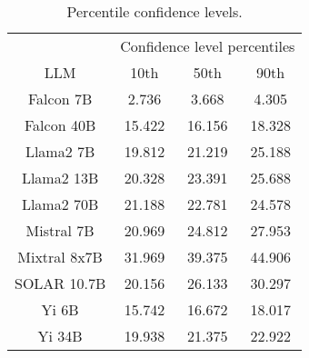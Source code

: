 \begin{table*}
\centering
\begin{tabular}{c|c|c|c}
& \multicolumn{3}{c}{Confidence level percentiles} \\ 
LLM & 10th & 50th & 90th\\ \hline
Falcon 7B & 2.736 & 3.668 & 4.305\\
Falcon 40B & 15.422 & 16.156 & 18.328\\
Llama2 7B & 19.812 & 21.219 & 25.188\\
Llama2 13B & 20.328 & 23.391 & 25.688\\
Llama2 70B & 21.188 & 22.781 & 24.578\\
Mistral 7B & 20.969 & 24.812 & 27.953\\
Mixtral 8x7B & 31.969 & 39.375 & 44.906\\
SOLAR 10.7B & 20.156 & 26.133 & 30.297\\
Yi 6B & 15.742 & 16.672 & 18.017\\
Yi 34B & 19.938 & 21.375 & 22.922\\
\hline
\end{tabular}
\caption{Percentile confidence levels.}
\label{tab:percentile_conf}
\end{table*}
